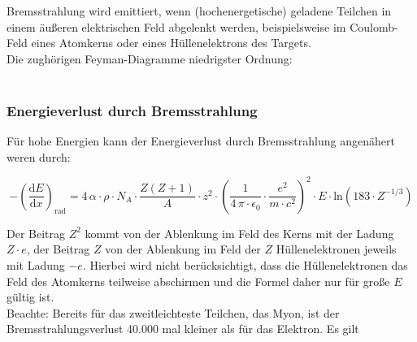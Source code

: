 \FloatBarrier
Bremsstrahlung wird emittiert, wenn (hochenergetische) geladene Teilchen in einem äußeren
elektrischen Feld abgelenkt werden, beispielsweise im Coulomb-Feld eines Atomkerns oder eines
Hüllenelektrons des Targets.
\\
Die zughörigen Feyman-Diagramme niedrigster Ordnung:
\\
\\

\begin{figure}[H]
	\begin{minipage}[b]{0.5\textwidth}
		\begin{figure}[H]
		\centering
		
		\end{figure}
	\end{minipage}
	\hspace{5mm} 
	\begin{minipage}[b]{0.5\textwidth}
		\begin{figure}[H]
		\centering
		
		\vspace{3mm}
		\end{figure} 
	\end{minipage} 
\end{figure}



\subsubsection*{Energieverlust durch Bremsstrahlung}

Für hohe Energien kann der Energieverlust durch Bremsstrahlung angenähert weren durch:

\[-\left(\frac{\mathrm{d}E}{\mathrm{d}x}\right)_{\text{rad}} = 4\,\alpha\cdot \rho\cdot N_A \cdot
\frac{Z(Z+1)}{A} \cdot z^2\cdot \left(\frac{1}{4\,\pi\cdot \epsilon_0}\cdot \frac{e^2}{m\cdot c^2}
\right)^2 \cdot E\cdot \text{ln}(183\cdot Z^{-1/3}) \]

Der Beitrag $Z^2$ kommt von der Ablenkung im Feld des Kerns mit der Ladung $Z\cdot e$, der Beitrag
$Z$ von der Ablenkung im Feld der $Z$ Hüllenelektronen jeweils mit Ladung $-e$. Hierbei wird nicht
berücksichtigt, dass die Hüllenelektronen das Feld des Atomkerns teilweise abschirmen und die Formel
daher nur für große $E$ gültig ist.
\\
Beachte: Bereits für das zweitleichteste Teilchen, das Myon, ist der Bremsstrahlungsverlust 40.000
mal kleiner als für das Elektron. Es gilt

